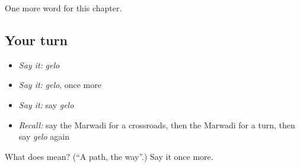 \begin{grammarlens}[title={What you've built}]
One more word for this chapter.
\end{grammarlens}

\subsection*{Your turn}
\begin{itemize}
\raggedright
  \item \emph{Say it:} \emph{gelo}
  \item \emph{Say it:} \emph{gelo}, once more
  \item \emph{Say it:} say \emph{gelo}
  \item \emph{Recall:} say the Marwadi for a crossroads, then the Marwadi for a turn, then say \emph{gelo} again
\end{itemize}

\begin{tcolorbox}[breakable,colback=teal!4,colframe=teal!35!black,title={Before you move on}]
What does  mean? (\textquotedblleft{}A path, the way\textquotedblright{}.) Say it once more.
\end{tcolorbox}
